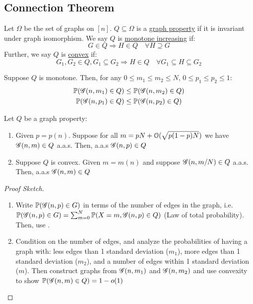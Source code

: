 \subsection{Connection Theorem}

\begin{definition}
    Let $\Omega$ be the set of graphs on $[n]$. $Q \subseteq \Omega$ is a \ul{graph property} if it is invariant under graph isomorphism.
    We say $Q$ is \ul{monotone increasing} if:
    \begin{equation*}
        G \in Q \Rightarrow H \in Q \quad \forall H \supseteq G
    \end{equation*}
    Further, we say $Q$ is \ul{convex} if:
    \begin{equation*}
        G_1, G_2 \in Q, G_1 \subseteq G_2 \Rightarrow H \in Q \quad \forall G_1 \subseteq H \subseteq G_2 
    \end{equation*}
\end{definition}

\begin{theorem}
    Suppose $Q$ is monotone.
    Then, for any $0 \leq m_1 \leq m_2 \leq N$, $0 \leq p_1 \leq p_2 \leq 1$:
    \begin{align*}
        \operatorname{\mathbb{P}}(\operatorname{\mathscr{G}}(n, m_1) \in Q) &\leq \operatorname{\mathbb{P}}(\operatorname{\mathscr{G}}(n, m_2) \in Q) \\
        \operatorname{\mathbb{P}}(\operatorname{\mathscr{G}}(n, p_1) \in Q) &\leq \operatorname{\mathbb{P}}(\operatorname{\mathscr{G}}(n, p_2) \in Q)
    \end{align*}
\end{theorem}

\begin{theorem}
    Let $Q$ be a graph property:
    \begin{enumerate}[label = (\roman*)]
        \item Given $p = p(n)$. Suppose for all $m = pN + \operatorname{\mathcal{O}}(\sqrt{p(1-p)N})$ we have $\operatorname{\mathscr{G}}(n, m) \in Q$ a.a.s. Then, a.a.s $\operatorname{\mathscr{G}}(n, p) \in Q$
        \item Suppose $Q$ is convex. Given $m = m(n)$ and suppose $\operatorname{\mathscr{G}}(n, m/N) \in Q$ a.a.s. Then, a.a.s $\operatorname{\mathscr{G}}(n, m) \in Q$
    \end{enumerate}
\end{theorem}
\begin{proof}[Proof Sketch]
    ~
    \begin{enumerate}[label = (\roman*)]
        \item Write $\operatorname{\mathbb{P}}(\operatorname{\mathscr{G}}(n, p) \in G)$ in terms of the number of edges in the graph, i.e. $\operatorname{\mathbb{P}}(\operatorname{\mathscr{G}}(n, p) \in G) = \sum_{m = 0}^N \operatorname{\mathbb{P}}(X = m, \operatorname{\mathscr{G}}(n, p) \in Q)$ (Law of total probability).
        Then, use .

        \item Condition on the number of edges, and analyze the probabilities of having a graph with: less edges than 1 standard deviation ($m_1$), more edges than 1 standard deviation ($m_2$), and a number of edges within 1 standard deviation ($m$).
        Then construct graphs from $\operatorname{\mathscr{G}}(n, m_1)$ and $\operatorname{\mathscr{G}}(n, m_2)$ and use convexity to show $\operatorname{\mathbb{P}}(\operatorname{\mathscr{G}}(n, m) \in Q) = 1 - o(1)$
    \end{enumerate}
\end{proof}